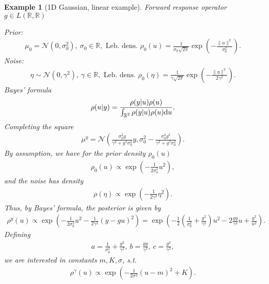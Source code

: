\documentclass[oneside,11pt]{book}
\numberwithin{equation}{section}
\newtheorem{example}{Example}[section]
\begin{document}
\begin{example}[1D Gaussian, linear example]
    Forward response operator $g\in L(\mathbb{R},\mathbb{R})$
    
    Prior:
    \begin{align*}
        \mu_0 = \mathcal{N}(0,\sigma_0^2),\ \sigma_0\in\mathbb{R}, \mbox{ Leb. dens. } \rho_0(u) = \frac{1}{\sigma_0\sqrt{2\pi}}\exp\left(-\frac{\|u\|^2}{\sigma_0^2}\right).
    \end{align*}
    Noise:
    \begin{align*}
        \eta\sim\mathcal{N}(0,\gamma^2),\ \gamma\in\mathbb{R}, \mbox{ Leb. dens. } \rho_0(\eta) = \frac{1}{\gamma\sqrt{2\pi}}\exp\left(-\frac{\|\eta\|^2}{2\gamma^2}\right).
    \end{align*}
    Bayes' formula
    \begin{align*}
        \rho(u|y) = \frac{\rho(y|u)\rho(u)}{\int_{\mathbb{R}^2} \rho(y|u)\rho(u){\rm d}u}.
    \end{align*}
    Completing the square
    \begin{align*}
        \mu^y = \mathcal{N}\left(\frac{\sigma_0^2g}{\gamma^2 + g^2\sigma_0^2}y,\sigma_0^2 - \frac{\sigma_0^4g^2}{\gamma^2 + g^2\sigma_0^2}\right).
    \end{align*}
    By assumption, we have for the prior density $\rho_0(u)$
    \begin{align*}
        \rho_0(u)\propto\exp\left(-\frac{1}{2\sigma_0^2}u^2\right),
    \end{align*}
    and the noise has density
    \begin{align*}
        \rho(\eta)\propto\exp\left(-\frac{1}{2\gamma^2}\eta^2\right).
    \end{align*}
    Thus, by Bayes' formula, the posterior is given by
    \begin{align*}
        \rho^y(u)\propto\exp\left(-\frac{1}{2\sigma_0^2}u^2 - \frac{1}{2\gamma^2}(y - gu)^2\right) = \exp\left(-\frac{1}{2}\left(\frac{1}{\sigma_0^2} + \frac{g^2}{\gamma^2}\right)u^2 - 2\frac{gy}{\gamma^2}u + \frac{y^2}{u^2}\right).
    \end{align*}
    Defining
    \begin{align*}
        a = \frac{1}{\sigma_0^2} + \frac{g^2}{\gamma^2},\ b = \frac{gy}{\gamma^2},\ c = \frac{y^2}{\gamma^2},
    \end{align*}
    we are interested in constants $m,K,\sigma$, s.t.
    \begin{align*}
        \rho^\gamma(u)\propto\exp\left(-\frac{1}{2\sigma^2}(u - m)^2 + K\right).

\end{align*}
\end{example}
\end{document}
